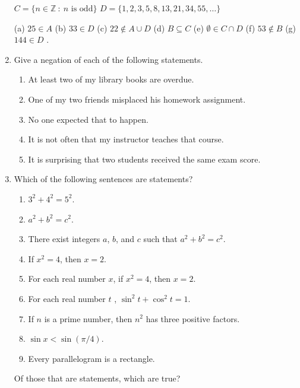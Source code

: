 \documentclass[12pt]{article}
\newcommand{\ZZ}{{\mathbb Z}}  %
\newcommand{\sep}{{\ :\ }}     %
\begin{document}
\begin{enumerate}
       $C= \{ n\in\ZZ \sep n\mbox{ is odd}\}$ \qquad  $D=\{1,2,3,5,8,13,21,34,55,\dotsc\}$

       (a) $25\in A$ \qquad
       (b) $33\in D$ \qquad
       (c) $22\not\in A\cup D$ \qquad
       (d) $B\subseteq C$ \newline
       (e) $\emptyset \in C\cap D$ \qquad
       (f) $53\not\in B$ \qquad
       (g) $144\in D$ .



\item Give a negation of each of the following statements.
   \begin{enumerate}
     \item At least two of my library books are overdue.
     \item One of my two friends misplaced his homework assignment.
     \item No one expected that to happen.
     \item It is not often that my instructor teaches that course.
     \item It is surprising that two students received the same exam score.
   \end{enumerate}

\item Which of the following sentences are statements?
  \begin{enumerate}
   \item $3^2+4^2=5^2$.
   \item $a^2+b^2=c^2$.
   \item There exist integers $a$, $b$, and $c$ such that  $ a^2+b^2=c^2$.
   \item If $x^2= 4$, then $x=2$.
   \item For each real number $x$,  if $x^2= 4$, then $x=2$.
   \item For each real number $t$ , $\sin^2 t + \cos^2 t =1$.
   \item If $n$ is a prime number, then $n^2$ has three positive factors.
   \item $\sin x < \sin(\pi/4)$.
   \item Every parallelogram is a rectangle.
  \end{enumerate}
 Of those that are statements, which are true?


\end{enumerate}
\end{document}
